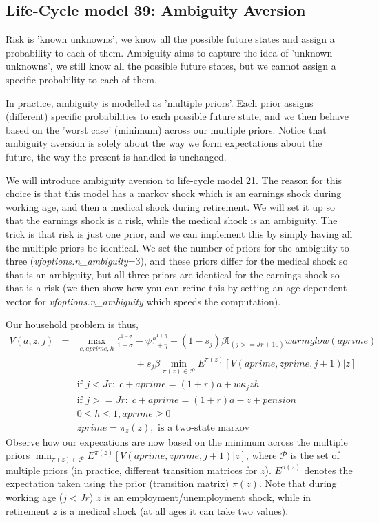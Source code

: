 \subsection{Life-Cycle model 39: Ambiguity Aversion}
Risk is 'known unknowns', we know all the possible future states and assign a probability to each of them. Ambiguity aims to capture the idea of 'unknown unknowns', we still know all the possible future states, but we cannot assign a specific probability to each of them.

In practice, ambiguity is modelled as 'multiple priors'. Each prior assigns (different) specific probabilities to each possible future state, and we then behave based on the 'worst case' (minimum) across our multiple priors. Notice that ambiguity aversion is solely about the way we form expectations about the future, the way the present is handled is unchanged.

We will introduce ambiguity aversion to life-cycle model 21. The reason for this choice is that this model has a markov shock which is an earnings shock during working age, and then a medical shock during retirement. We will set it up so that the earnings shock is a risk, while the medical shock is an ambiguity. The trick is that risk is just one prior, and we can implement this by simply having all the multiple priors be identical. We set the number of priors for the ambiguity to three (\textit{vfoptions.n\_{}ambiguity}=3), and these priors differ for the medical shock so that is an ambiguity, but all three priors are identical for the earnings shock so that is a risk (we then show how you can refine this by setting an age-dependent vector for  \textit{vfoptions.n\_{}ambiguity} which speeds the computation).

Our household problem is thus,
\begin{eqnarray*}
 V(a,z,j)&=& \max_{c,aprime,h} \frac{c^{1-\sigma}}{1-\sigma} - \psi \frac{h^{1+\eta}}{1+\eta} + (1-s_j)\beta   \mathbb{I}_{(j>=Jr+10)} warmglow(aprime)   \\
 && \quad \quad \quad \quad \quad \quad + s_j \beta \min_{\pi(z) \in \mathcal{P}} E^{\pi(z)}[V(aprime,zprime,j+1)|z] \\
&& \text{if }j<Jr: \; c+aprime=(1+r)a+w \kappa_j z h \\
&& \text{if }j>=Jr: \; c+aprime=(1+r)a -z +pension\\
&& 0\leq h \leq 1, aprime\geq 0 \\
&& zprime=\pi_z(z), \text{  is a two-state markov}
\end{eqnarray*}
Observe how our expecations are now based on the minimum across the multiple priors $\min_{\pi(z) \in \mathcal{P}} E^{\pi(z)}[V(aprime,zprime,j+1)|z]$, where $\mathcal{P}$ is the set of multiple priors (in practice, different transition matrices for $z$). $E^{\pi(z)}$ denotes the expectation taken using the prior (transition matrix) $\pi(z)$. Note that during working age ($j<Jr$) $z$ is an employment/unemployment shock, while in retirement $z$ is a medical shock (at all ages it can take two values).

